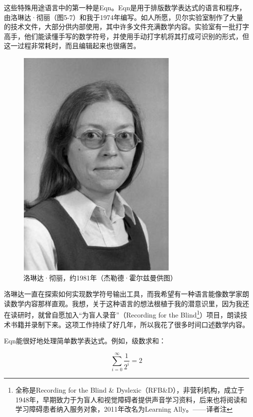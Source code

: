 \documentclass[a4paper,12pt,UTF8,twoside]{ctexbook}
\begin{document}
这些特殊用途语言中的第一种是Eqn。Eqn是用于排版数学表达式的语言和程序，由洛琳达·彻丽（图5-7）和我于1974年编写。如人所愿，贝尔实验室制作了大量的技术文件，大部分供内部使用，其中许多文件充满数学内容。实验室有一批打字高手，他们能读懂手写的数学符号，并使用手动打字机将其打成可识别的形式，但这一过程非常耗时，而且编辑起来也很痛苦。

\begin{figure}[htbp]
	\centering
	\includegraphics[width=0.7\linewidth]{46}
	\caption{洛琳达·彻丽，约1981年（杰勒德·霍尔兹曼供图）}
	\label{fig:1}
\end{figure}

洛琳达一直在探索如何实现数学符号输出工具，而我希望有一种语言能像数学家朗读数学内容那样直观。我想，关于这种语言的想法根植于我的潜意识里，因为我还在读研时，就曾自愿加入“为盲人录音”（Recording for the Blind\footnote{全称是Recording for the Blind \& Dyslexic（RFB\&D），非营利机构，成立于1948年，早期致力于为盲人和视觉障碍者提供声音学习资料，后来也将阅读和学习障碍患者纳入服务对象，2011年改名为Learning Ally。——译者注}）项目，朗读技术书籍并录制下来。这项工作持续了好几年，所以我花了很多时间口述数学内容。

Eqn能很好地处理简单数学表达式。例如，级数求和：

\begin{equation}
\sum_{i=0}^{\infty } \frac{1}{2^{i} } = 2
\end{equation}
\end{document}
